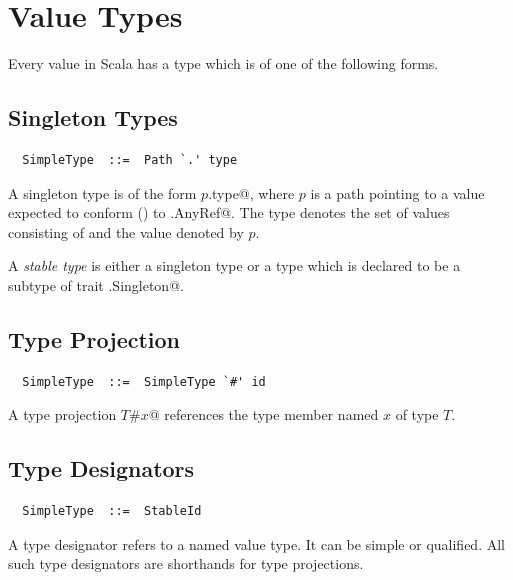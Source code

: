 \section{Value Types}\label{sec:value-types}

Every value in Scala has a type which is of one of the following
forms.

\subsection{Singleton Types}
\label{sec:singleton-types}
\label{sec:type-stability}

\syntax\begin{lstlisting}
  SimpleType  ::=  Path `.' type
\end{lstlisting}

A singleton type is of the form \lstinline@$p$.type@, where $p$ is a
path pointing to a value expected to conform ()
to \lstinline@scala.AnyRef@.  The type denotes the set of values
consisting of  and the value denoted by $p$. 

A {\em stable type} is either a singleton type or a type which is
declared to be a subtype of trait \lstinline@scala.Singleton@.

\subsection{Type Projection}
\label{sec:type-project}

\syntax\begin{lstlisting} 
  SimpleType  ::=  SimpleType `#' id
\end{lstlisting}

A type projection \lstinline@$T$#$x$@ references the type member named
$x$ of type $T$. 

\subsection{Type Designators}
\label{sec:type-desig}

\syntax\begin{lstlisting}
  SimpleType  ::=  StableId
\end{lstlisting}

A type designator refers to a named value type. It can be simple or
qualified. All such type designators are shorthands for type projections.

